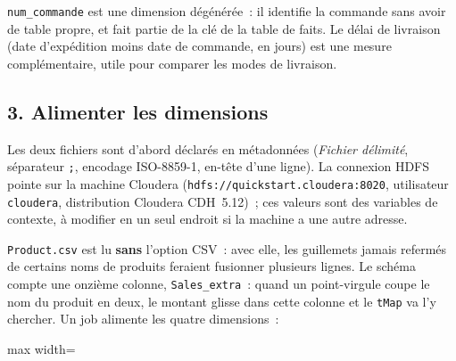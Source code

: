 \noindent \texttt{num\_commande} est une dimension dégénérée~: il identifie la commande sans avoir de table propre, et fait partie de la clé de la table de faits. Le délai de livraison (date d'expédition moins date de commande, en jours) est une mesure complémentaire, utile pour comparer les modes de livraison.

\subsection*{3. Alimenter les dimensions}
{}

\noindent Les deux fichiers sont d'abord déclarés en métadonnées (\textit{Fichier délimité}, séparateur \texttt{;}, encodage ISO-8859-1, en-tête d'une ligne). La connexion HDFS pointe sur la machine Cloudera (\texttt{hdfs://quickstart.cloudera:8020}, utilisateur \texttt{cloudera}, distribution Cloudera CDH~5.12)~; ces valeurs sont des variables de contexte, à modifier en un seul endroit si la machine a une autre adresse.

\noindent \texttt{Product.csv} est lu \textbf{sans} l'option CSV~: avec elle, les guillemets jamais refermés de certains noms de produits feraient fusionner plusieurs lignes. Le schéma compte une onzième colonne, \texttt{Sales\_extra}~: quand un point-virgule coupe le nom du produit en deux, le montant glisse dans cette colonne et le \texttt{tMap} va l'y chercher. Un job alimente les quatre dimensions~:

\begin{center}
\begin{adjustbox}{max width=\linewidth}
\end{adjustbox}
\end{center}

